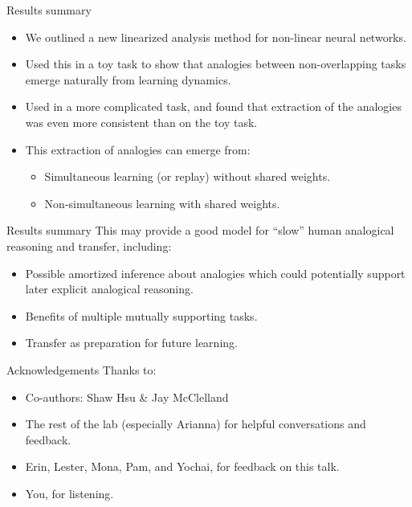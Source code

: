 \documentclass{beamer}
\begin{document}
\begin{frame}{Results summary}
\begin{itemize}
    \item<1-> We outlined a new linearized analysis method for non-linear neural networks. 
    \item<2-> Used this in a toy task to show that analogies between non-overlapping tasks emerge naturally from learning dynamics. 
    \item<3-> Used in a more complicated task, and found that extraction of the analogies was even more consistent than on the toy task. 
    \item<4-> This extraction of analogies can emerge from:
    \begin{itemize}
	\item<5-> Simultaneous learning (or replay) without shared weights. 
	\item<6-> Non-simultaneous learning with shared weights.
    \end{itemize}
\end{itemize}
\end{frame}

\begin{frame}{Results summary}
This may provide a good model for ``slow'' human analogical reasoning and transfer, including:
\begin{itemize}
    \item<2-> Possible amortized inference about analogies which could potentially support later explicit analogical reasoning.
    \item<3-> Benefits of multiple mutually supporting tasks.
    \item<4-> Transfer as preparation for future learning.
\end{itemize}
\end{frame}

\begin{frame}{Acknowledgements}
Thanks to:
\begin{itemize}
    \item Co-authors: Shaw Hsu \& Jay McClelland
    \item The rest of the lab (especially Arianna) for helpful conversations and feedback. 
    \item Erin, Lester, Mona, Pam, and Yochai, for feedback on this talk.
    \item You, for listening.
\end{itemize}
\end{frame}
\end{document}
